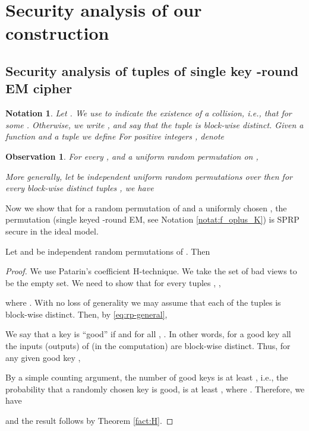 \documentclass{llncs}
\newtheorem{notat}{Notation}
\newtheorem{obs}{Observation}
\begin{document}
\section{Security analysis of our construction}\label{sec:proof}

\subsection{Security analysis of tuples of single key -round  EM cipher}

\begin{notat}
Let .
We use  to indicate the existence of a collision, i.e., that
 for some . Otherwise, we write , and say that the tuple  is block-wise distinct. Given a function  and a tuple  we define 
For positive integers , denote

\end{notat}

\begin{obs}
For every ,  and a uniform random permutation  on ,

More generally, let  be independent uniform random permutations over  then for every block-wise distinct tuples ,  we have

\end{obs}

Now we show that for a random permutation  of  and a uniformly chosen , the permutation  (single keyed -round EM, see Notation \ref{notat:f_oplus_K}) is SPRP secure in the ideal model.
\begin{lemma}
\label{lemma2}
Let  and  be independent random permutations of . Then

\end{lemma}
\begin{proof} We use Patarin's coefficient H-technique. We take the set of bad views  to be the empty set.
We need to show that for every tuples , ,

where .
With no loss of generality we may assume that each of the tuples  is block-wise distinct. Then, by \eqref{eq:rp-general},

We say that a key  is ``good'' if   and  for all , . In other words, for a good key all the inputs (outputs) of  (in the  computation) are block-wise distinct. Thus, for any given good key ,

By a simple counting argument, the number of good keys is at least , i.e., the probability that a randomly chosen key is good, is at least , where . Therefore, we have

and the result follows by Theorem \ref{fact:H}.
\end{proof}
\end{document}
